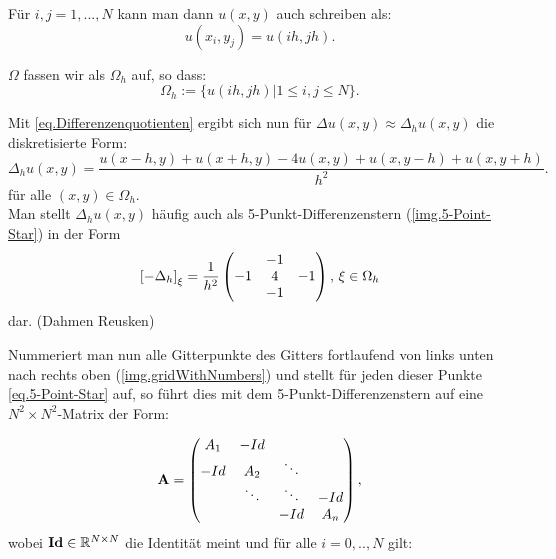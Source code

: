 Für $i,j = 1,...,N$ kann man dann $u(x,y)$ auch schreiben als:
\begin{equation}
u(x_{i},y_{j}) = u(ih,jh).
\end{equation}

$\Omega$ fassen wir als $\Omega_{h}$ auf, so dass:
\begin{equation}
\Omega_{h} := \{u(ih, jh) | 1 \le i,j \le N\}.
\end{equation}

\label{img.5-Point-Star}

Mit \autoref{eq.Differenzenquotienten} ergibt sich nun für $\Delta u(x,y) \approx \Delta_{h} u(x,y)$ die diskretisierte Form:
\begin{equation}
\Delta_{h} u(x,y) = \frac {u(x-h,y) + u(x+h,y) - 4u(x,y) + u(x,y-h) + u(x,y+h)} {h^{2}}.\label{eq.5-Point-Star}
\end{equation}
für alle $(x,y) \in \Omega_{h}$. \\
Man stellt $\Delta_{h} u(x,y)$ häufig auch als 5-Punkt-Differenzenstern (\autoref{img.5-Point-Star}) in der Form
\begin{equation}
\left[-\Delta_{h}\right]_{\xi} = \frac {1} {h^{2}}
\begin{pmatrix}
  & -1 & \\
-1 & 4 & -1 \\
  & -1 & 
\end{pmatrix}
\textnormal{, } \xi \in \Omega_{h}
\end{equation}
dar. (Dahmen Reusken)

\label{img.gridWithNumbers}

Nummeriert man nun alle Gitterpunkte des Gitters fortlaufend von links unten nach rechts oben (\autoref{img.gridWithNumbers}) und stellt für jeden dieser Punkte \autoref{eq.5-Point-Star} auf, so führt dies mit dem 5-Punkt-Differenzenstern auf eine $N^{2} \times N^{2}$-Matrix der Form:

\begin{equation}
{\textbf{A}} =
\begin{pmatrix}
A_{1} & -Id \\
-Id & A_{2} & \ddots \\
 & \ddots & \ddots & -Id \\
 & & -Id & A_{n}
\end{pmatrix},\label{eq.2D Matrix}
\end{equation}
wobei ${\textbf{Id}} \in \mathbb{R}^{N \times N}$ die Identität meint und für alle $i = 0,..,N$ gilt:

